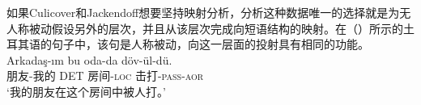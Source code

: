 \begin{exe}
\begin{xlist}[iv.]
\begin{exe}
\begin{xlist}[iv.]

如果Culicover和Jackendoff想要坚持映射分析，分析这种数据唯一的选择就是为无人称被动假设另外的层次，并且从该层次完成向短语结构的映射。在（）所示的土耳其语的句子中，该句是人称被动，向这一层面的投射具有相同的功能。
\ea
\gll Arkadaş-ım bu oda-da döv-ül-dü.\\
     朋友-我的  DET   房间-\textsc{loc} 击打-\textsc{pass}-\textsc{aor}\\
\glt `我的朋友在这个房间中被人打。'%
\z


\end{xlist}
\end{exe}
\end{xlist}
\end{exe}

